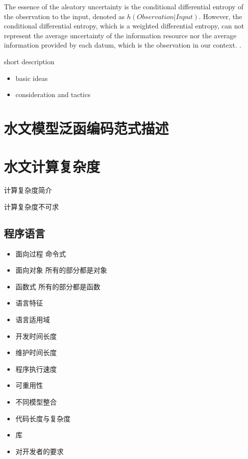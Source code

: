  

The essence of the aleatory uncertainty is the conditional 
differential entropy of the observation to the input, 
denoted as  $h(Observation|Input)$. However, the 
conditional differential entropy, which is a weighted 
differential entropy, can not represent the average 
uncertainty of the information resource nor the average 
information provided by each datum, which is the 
observation in our context. \cite{}.





short description
\begin{itemize}
\item basic ideas
\item consideration and tactics
\end{itemize}
\section{水文模型泛函编码范式描述}

\section{水文计算复杂度}

计算复杂度简介

计算复杂度不可求



\subsection{程序语言}
\begin{itemize}
\item 面向过程 命令式
\item 面向对象 所有的部分都是对象
\item 函数式 所有的部分都是函数
\end{itemize}
\begin{itemize}
\item 语言特征
\item 语言适用域
\item 开发时间长度
\item 维护时间长度
\item 程序执行速度
\item 可重用性
\item 不同模型整合
\item 代码长度与复杂度
\item 库
\item 对开发者的要求
\end{itemize}

